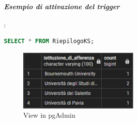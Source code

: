 \documentclass[a4page]{article}
\begin{document}
\paragraph{\textit{Esempio di attivazione del trigger}}:
\begin{lstlisting}[language=SQL,
        deletekeywords={IDENTITY,INT},
        morekeywords={clustered},    
        framesep=10pt,
        framextopmargin=10pt]
SELECT * FROM RiepilogoKS; 
\end{lstlisting}
\begin{figure}[h!]
\includegraphics[width=6cm]{VIEW}
\caption{View in pgAdmin}
\end{figure}
\newpage
\end{document}
